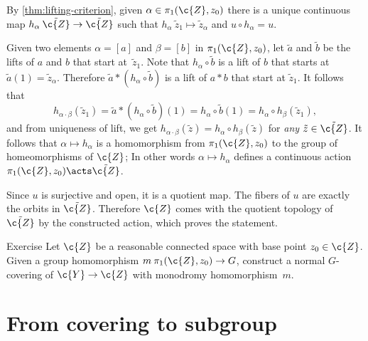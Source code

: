 By \ref{thm:lifting-criterion}, given $\alpha\in \pi_1(\c{Z},z_0)$ there is a unique continuous map $h_\alpha\:\tilde{\c{Z}}\to \tilde{\c{Z}}$ such that $h_\alpha\:\tilde z_1\mapsto \tilde z_\alpha$ and $u\circ h_\alpha=u$.

Given two elements $\alpha=[a]$ and $\beta=[b]$ in $\pi_1(\c{Z},z_0)$,
let $\tilde a$ and $\tilde b$ be the lifts of $a$ and $b$ that start at~$\tilde z_1$.
Note that $h_\alpha\circ \tilde b$ is a lift of $b$ that starts at $\tilde a(1)=\tilde z_\alpha$.
Therefore $\tilde a*(h_\alpha\circ \tilde b)$ is a lift of $a*b$ that start at $\tilde z_1$.
It follows that
\[h_{\alpha\cdot \beta}(\tilde z_1)=\tilde a*(h_\alpha\circ \tilde b)(1)=h_\alpha\circ\tilde b(1)=h_\alpha\circ h_\beta(\tilde z_1),\] and from uniqueness of lift, we get $h_{\alpha\cdot \beta}(\tilde z)=h_\alpha\circ h_\beta(\tilde z)$ for \textit{any} $\tilde z\in\tilde{\c{Z}}$.
It follows that $\alpha\mapsto h_\alpha$ is a homomorphism from $\pi_1(\c{Z},z_0)$ to the group of homeomorphisms of $\c{Z}$;
In other words $\alpha\mapsto h_\alpha$ defines a continuous action $\pi_1(\c{Z},z_0)\acts\tilde{\c{Z}}$.


Since $u$ is surjective and open, it is a quotient map.
The fibers of $u$ are exactly the orbits in $\tilde{\c{Z}}$.
Therefore $\c{Z}$ comes with the quotient topology of $\tilde{\c{Z}}$ by the constructed action, which proves the statement.
\qeds

\begin{thm}{Exercise}\label{ex:given-monodromy}
Let $\c{Z}$ be a reasonable connected space with base point $z_0\in\c{Z}$.
Given a group homomorphism $m\:\pi_1(\c{Z},z_0)\to G$, construct a normal $G$-covering of $\c{Y}\to\c{Z}$ with monodromy homomorphism~$m$.
\end{thm}

















\section{From covering to subgroup}


\begin{figure}
\vskip-6mm
\centering
{}
\end{figure}


